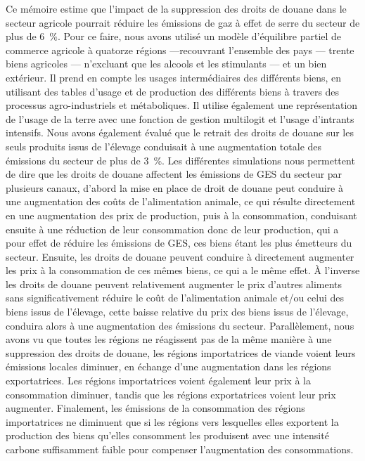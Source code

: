 Ce mémoire estime que l'impact de la suppression des droits de douane dans le secteur agricole pourrait réduire les émissions de gaz à effet de serre du secteur de plus de 6~\%. Pour ce faire, nous avons utilisé un modèle d'équilibre partiel de commerce agricole à quatorze régions  —recouvrant l'ensemble des pays — trente biens agricoles — n'excluant que les alcools et les stimulants — et un bien extérieur. Il prend en compte les usages intermédiaires des différents biens, en utilisant des tables d'usage et de production des différents biens à travers des processus agro-industriels et métaboliques. Il utilise également une représentation de l'usage de la terre avec une fonction de gestion multilogit et l'usage d'intrants intensifs. Nous avons également évalué que le retrait des droits de douane sur les seuls produits issus de l'élevage conduisait à une augmentation totale des émissions du secteur de plus de 3~\%. Les différentes simulations nous permettent de dire que les droits de douane affectent les émissions de GES du secteur par plusieurs canaux, d'abord la mise en place de droit de douane peut conduire à une augmentation des coûts de l'alimentation animale, ce qui résulte directement en une augmentation des prix de production, puis à la consommation, conduisant ensuite à une réduction de leur consommation donc de leur production, qui a pour effet de réduire les émissions de GES, ces biens étant les plus émetteurs du secteur. Ensuite, les droits de douane peuvent conduire à directement augmenter les prix à la consommation de ces mêmes biens, ce qui a le même effet. À l'inverse les droits de douane peuvent relativement augmenter le prix d'autres aliments sans significativement réduire le coût de l'alimentation animale et/ou celui des biens issus de l'élevage, cette baisse relative du prix des biens issus de l'élevage, conduira alors à une augmentation des émissions du secteur. Parallèlement, nous avons vu que toutes les régions ne réagissent pas de la même manière à une suppression des droits de douane, les régions importatrices de viande voient leurs émissions locales diminuer, en échange d'une augmentation dans les régions exportatrices. Les régions importatrices voient également leur prix à la consommation diminuer, tandis que les régions exportatrices voient leur prix augmenter. Finalement, les émissions de la consommation des régions importatrices ne diminuent que si les régions vers lesquelles elles exportent la production des biens qu'elles consomment les produisent avec une intensité carbone suffisamment faible pour compenser l'augmentation des consommations.

